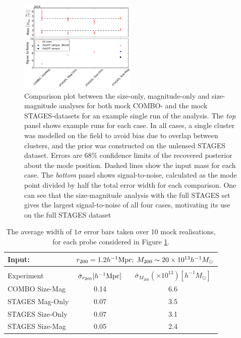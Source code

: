 \documentclass[useAMS,usenatbib,times,letter,amssymb]{mn2e}
\begin{document}
\begin{figure}
\centering
\includegraphics[width = 0.5\textwidth]{Figures/Mock_Application/Experiment_Comparison_wStN_10Run.pdf}
\caption[Example results for a size-only, magnitude-only and joint size-magnitude cluster reconstruction using mock STAGES and COMBO data, with signal--to--noise]{Comparison plot between the size-only, magnitude-only and size-magnitude analyses for both mock COMBO- and the mock STAGES-datasets for an example single run of the analysis. The {\it top} panel shows example runs for each case. In all cases, a single cluster was modelled on the field to avoid bias due to overlap between clusters, and the prior was constructed on the unlensed STAGES dataset. Errors are 68\% confidence limits of the recovered posterior about the mode position. Dashed lines show the input mass for each case. The {\it bottom} panel shows signal-to-noise, calculated as the mode point divided by half the total error width for each comparison. One can see that the size-magnitude analysis with the full STAGES set gives the largest signal-to-noise of all four cases, motivating its use on the full STAGES dataset} \label{fig:Experiment_Comparison}
\end{figure}

\begin{table}
\begin{center}
\caption{The average width of $1\sigma$ error bars taken over 10 mock realisations, for each probe considered in Figure \ref{fig:Experiment_Comparison}.}\label{Table:Experiment_Average_Noise}
\begin{tabular}{|l|c|c|}
\hline
Input: & \multicolumn{2}{c|}{$r_{200} = 1.2 h^{-1}{\rm Mpc} ;\; M_{200} \sim 20\times10^{13} h^{-1}M_{\odot} $} \\
\hline
\\
Experiment & $\bar{\sigma}_{r_{200}} [h^{-1}{\rm Mpc}]$ & $\bar{\sigma}_{M_{200}} (\times 10^{13}) [h^{-1}M_{\odot}] $ \\
\hline
COMBO Size-Mag &0.14 & 6.6 \\
\hline
STAGES Mag-Only &0.07 & 3.5 \\
\hline
STAGES Size-Only & 0.07 &  3.1\\
\hline
STAGES Size-Mag & 0.05 & 2.4\\
\hline
\end{tabular}
\end{center}
\end{table}
\end{document}
